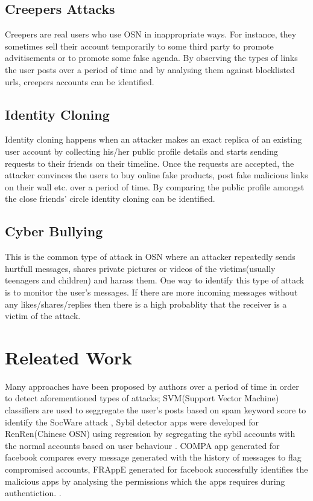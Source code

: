 \documentclass[conference]{IEEEtran}
\begin{document}
\subsection{Creepers Attacks}
Creepers are real users who use OSN in inappropriate ways. For instance, they sometimes sell their account temporarily to some third party to promote advitisements or to promote some false agenda. By observing the types of links the user posts over a period of time and by analysing them against blocklisted urls, creepers accounts can be identified.

\subsection{Identity Cloning}
Identity cloning happens when an attacker makes an exact replica of an existing user account by collecting his/her public profile details and starts sending requests to their friends on their timeline. Once the requests are accepted, the attacker convinces the users to buy online fake products, post fake malicious links on their wall etc. over a period of time. By comparing the public profile amongst the close friends' circle identity cloning can be identified.

\subsection{Cyber Bullying}
This is the common type of attack in OSN where an attacker repeatedly sends hurtfull messages, shares private pictures or videos of the victims(usually teenagers and children) and harass them. One way to identify this type of attack is to monitor the user's messages. If there are more incoming messages without any likes/shares/replies then there is a high probablity that the receiver is a victim of the attack.

\section{Releated Work}
Many approaches have been proposed by authors over a period of time in order to detect aforementioned types of attacks; SVM(Support Vector Machine) classifiers are used to seggregate the user's posts based on spam keyword score to identify the SocWare attack \cite{1}, Sybil detector apps were developed for RenRen(Chinese OSN) using regression by segregating the sybil accounts with the normal accounts based on user behaviour \cite{2} \cite{3}. COMPA app generated for facebook compares every message generated with the history of messages to flag compromised accounts, FRAppE generated for facebook successfully identifies the malicious apps by analysing the permissions which the apps requires during authentiction. \cite{4}.
\end{document}
